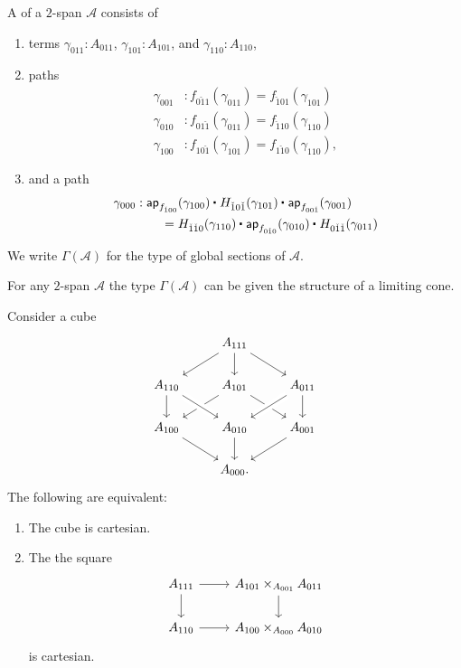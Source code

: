 \begin{defn}
A  of a $2$-span $\mathcal{A}$ consists of
\begin{enumerate}
\item terms $\gamma_{011}:A_{011}$, $\gamma_{101}:A_{101}$, and $\gamma_{110}:A_{110}$,
\item paths
\begin{align*}
\gamma_{001} & : f_{0\check{1}1}(\gamma_{011}) = f_{\check{1}01}(\gamma_{101}) \\
\gamma_{010} & : f_{01\check{1}}(\gamma_{011}) = f_{\check{1}10}(\gamma_{110}) \\
\gamma_{100} & : f_{10\check{1}}(\gamma_{101}) = f_{1\check{1}0}(\gamma_{110}),
\end{align*}
\item and a path
\begin{align*}
\gamma_{000} & : \ct{\mathsf{ap}_{f_{\check{1}00}}(\gamma_{100})}{H_{\check{1}0\check{1}}(\gamma_{101})}{\mathsf{ap}_{f_{00\check{1}}}(\gamma_{001})} \\
& \qquad = \ct{H_{\check{1}\check{1}0}(\gamma_{110})}{\mathsf{ap}_{f_{0\check{1}0}}(\gamma_{010})}{H_{0\check{1}\check{1}}(\gamma_{011})}
\end{align*}
\end{enumerate}
We write $\Gamma(\mathcal{A})$ for the type of global sections of $\mathcal{A}$.
\end{defn}

\begin{thm}
For any $2$-span $\mathcal{A}$ the type $\Gamma(\mathcal{A})$ can be given the structure of a limiting cone.
\end{thm}

\begin{thm}
Consider a cube
\begin{equation*}
\begin{tikzcd}
& A_{111} \arrow[dl] \arrow[d] \arrow[dr] \\
A_{110} \arrow[d] & A_{101} \arrow[dl] \arrow[dr] & A_{011} \arrow[d] \\
A_{100} \arrow[dr] & A_{010} \arrow[d] \arrow[from=ul,crossing over] \arrow[from=ur,crossing over] & A_{001} \arrow[dl] \\
& A_{000}.
\end{tikzcd}
\end{equation*}
The following are equivalent:
\begin{enumerate}
\item The cube is cartesian.
\item The the square
\begin{equation*}
\begin{tikzcd}
A_{111} \arrow[r] \arrow[d] & A_{101}\times_{A_{001}} A_{011} \arrow[d] \\
A_{110} \arrow[r] & A_{100} \times_{A_{000}} A_{010}
\end{tikzcd}
\end{equation*}
is cartesian.
\end{enumerate}
\end{thm}

